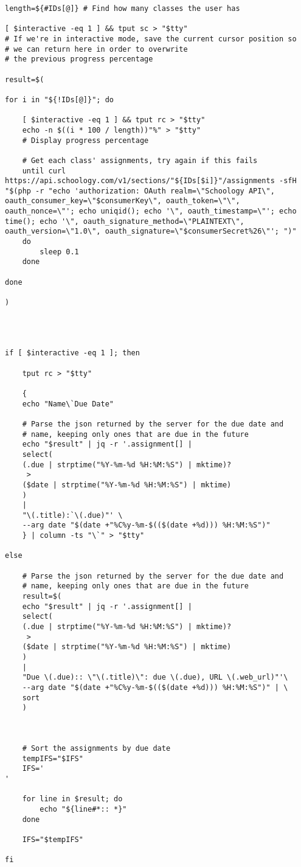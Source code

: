 \begin{lstlisting}
length=${#IDs[@]} # Find how many classes the user has

[ $interactive -eq 1 ] && tput sc > "$tty"
# If we're in interactive mode, save the current cursor position so
# we can return here in order to overwrite
# the previous progress percentage

result=$(

for i in "${!IDs[@]}"; do

	[ $interactive -eq 1 ] && tput rc > "$tty"
	echo -n $((i * 100 / length))"%" > "$tty"
	# Display progress percentage

	# Get each class' assignments, try again if this fails
	until curl https://api.schoology.com/v1/sections/"${IDs[$i]}"/assignments -sfH "$(php -r "echo 'authorization: OAuth realm=\"Schoology API\", oauth_consumer_key=\"$consumerKey\", oauth_token=\"\", oauth_nonce=\"'; echo uniqid(); echo '\", oauth_timestamp=\"'; echo time(); echo '\", oauth_signature_method=\"PLAINTEXT\", oauth_version=\"1.0\", oauth_signature=\"$consumerSecret%26\"'; ")"
	do
		sleep 0.1
	done

done

)




if [ $interactive -eq 1 ]; then

	tput rc > "$tty"

	{
	echo "Name\`Due Date"

	# Parse the json returned by the server for the due date and
	# name, keeping only ones that are due in the future
 	echo "$result" | jq -r '.assignment[] |
	select(
	(.due | strptime("%Y-%m-%d %H:%M:%S") | mktime)?
	 > 
	($date | strptime("%Y-%m-%d %H:%M:%S") | mktime)
	)
	|
	"\(.title):`\(.due)"' \
	--arg date "$(date +"%C%y-%m-$(($(date +%d))) %H:%M:%S")"
	} | column -ts "\`" > "$tty"

else

	# Parse the json returned by the server for the due date and
	# name, keeping only ones that are due in the future
	result=$(
	echo "$result" | jq -r '.assignment[] |
	select(
	(.due | strptime("%Y-%m-%d %H:%M:%S") | mktime)?
	 > 
	($date | strptime("%Y-%m-%d %H:%M:%S") | mktime)
	)
	|
	"Due \(.due):: \"\(.title)\": due \(.due), URL \(.web_url)"'\
	--arg date "$(date +"%C%y-%m-$(($(date +%d))) %H:%M:%S")" | \
	sort
	)



	# Sort the assignments by due date
	tempIFS="$IFS"
	IFS='
'

	for line in $result; do
		echo "${line#*:: *}"
	done

	IFS="$tempIFS"

fi
\end{lstlisting}